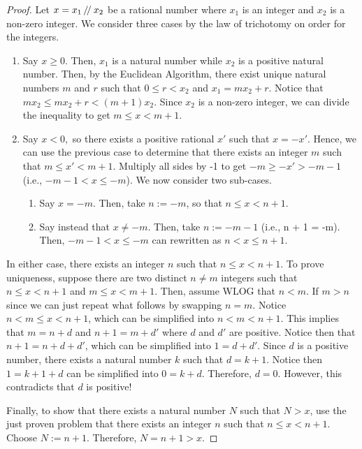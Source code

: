 \begin{proof}
    Let $x = x_1 \, \textrm{/}\!\textrm{/} \: x_2$ be a rational number where $x_1$ is an integer and $x_2$ is a non-zero integer.
    We consider three cases by the law of trichotomy on order for the integers.
    \begin{enumerate}
        \item Say $x \geq 0.$ Then, $x_1$ is a natural number while $x_2$ is a positive natural number. 
        Then, by the Euclidean Algorithm, there exist unique natural numbers $m$ and $r$ such that $0 \leq r < x_2$ and $x_1 = m x_2 + r.$
        Notice that $mx_2 \leq m x_2 + r < (m + 1) x_2.$ Since $x_2$ is a non-zero integer, we can divide the inequality to get $m \leq x < m + 1$.
        \item Say $x < 0,$ so there exists a positive rational $x'$ such that $x = -x'.$ 
        Hence, we can use the previous case to determine that there exists an integer $m$ such that $m \leq x' < m + 1.$
        Multiply all sides by -1 to get $-m \geq -x' > -m - 1$ (i.e., $-m-1 < x \leq -m$). We now consider two sub-cases.
        \begin{enumerate}
            \item Say $x = -m.$ Then, take $n:= -m$, so that $n \leq x < n + 1.$
            \item Say instead that $x \neq -m$. Then, take $n := -m - 1$ (i.e., n + 1 = -m). Then, $-m-1 < x \leq -m$ can rewritten as $n < x \leq n +1$.
        \end{enumerate}
    \end{enumerate}
    In either case, there exists an integer $n$ such that $n \leq x < n +1.$
    To prove uniqueness, suppose there are two distinct $n \neq m$ integers such that $n \leq x < n+1$ and $m \leq x < m + 1.$
    Then, assume WLOG that $n < m$. If $m > n$ since we can just repeat what follows by swapping $n = m.$
    Notice $n < m \leq x < n +1$, which can be simplified into $n < m < n +1.$
    This implies that $m = n + d$ and $n + 1 = m + d'$ where $d$ and $d'$ are positive.
    Notice then that $n + 1 = n + d + d'$, which can be simplified into $1 = d + d'.$
    Since $d$ is a positive number, there exists a natural number $k$ such that $d = k +1.$ 
    Notice then $1 = k + 1 + d$ can be simplified into $0 = k + d.$
    Therefore, $d = 0.$ However, this contradicts that $d$ is positive!
    
    Finally, to show that there exists a natural number $N$ such that $N > x$, use the just proven problem that there exists an integer $n$ such that $n \leq x < n + 1.$
    Choose $N := n + 1.$ 
    Therefore, $N = n + 1 > x.$

\end{proof}

